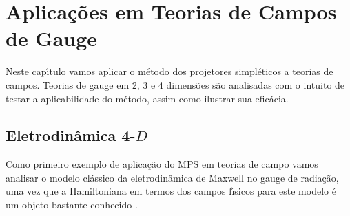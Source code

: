 \documentclass[a4paper,thmsa,12pt]{report}
\begin{document}
\chapter{{\sc Aplica\c c\~oes em Teorias de Campos de Gauge}}

Neste cap\'{\i}tulo vamos aplicar o m\'{e}todo dos projetores
simpl\'{e}ticos a teorias de campos. Teorias de gauge em 2, 3 e 4
dimens\~{o}es s\~{a}o analisadas com o intuito de testar a aplicabilidade do
m\'{e}todo, assim como ilustrar sua efic\'{a}cia.

\section{{\sc Eletrodin\^amica 4-$D$}}

Como primeiro exemplo de aplica\c{c}\~{a}o do MPS em teorias de campo vamos
analisar o mo\-de\-lo cl\'{a}ssico da eletrodin\^{a}mica de Maxwell no gauge de
radia\c{c}\~{a}o, uma vez que a Hamiltoniana em termos dos campos
f\'{\i}sicos para este modelo \'{e} um objeto bastante conhecido \cite
{sakurai}.
\end{document}
